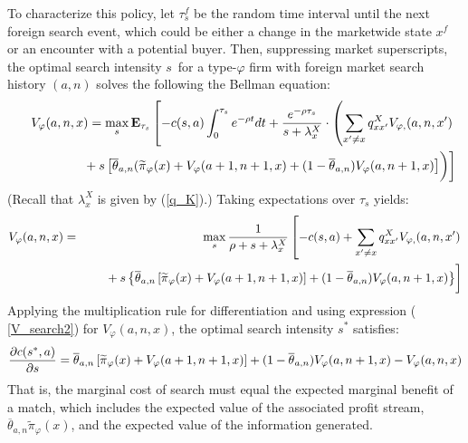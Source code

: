 \documentclass[12pt]{article}
\begin{document}
To characterize this policy, let $\tau _{s}^{f}$ be the random time interval
until the next foreign search event, which could be either a change in the
marketwide state $x^{f}$ or an encounter with a potential buyer. Then,
suppressing market superscripts, the optimal search intensity $s$\ for a
type-$\varphi $ firm with foreign market search history $(a,n)$ solves the
following the Bellman equation:%
\begin{eqnarray*}
&&V_{\varphi }(a,n,x)=\max_{s}\mathbf{E}_{\tau _{s}}\left[
-c(s,a)\int_{0}^{\tau _{s}}e^{-\rho t}dt+\frac{e^{-\rho \tau _{s}}}{%
s+\lambda _{x}^{X}}\cdot \left( \sum_{x^{\prime }\neq x}q_{xx^{\prime
}}^{X}V_{\varphi ,}(a,n,x^{\prime })\right. \right. \\
\; &&\left. \left. 
\begin{array}{c}
\; \\ 
\;%
\end{array}%
+s\left[ \overline{\theta }_{a,n}(\widetilde{\pi }_{\varphi }(x)+V_{\varphi
}(a+1,n+1,x)+(1-\overline{\theta }_{a,n})V_{\varphi }(a,n+1,x)\right]
\right) \right]
\end{eqnarray*}%
(Recall that $\lambda _{x}^{X}$ is given by (\ref{q_K}).) Taking
expectations over $\tau _{s}$ yields:%
\begin{eqnarray}
V_{\varphi }(a,n,x) &=&\max_{s}\frac{1}{\rho +s+\lambda _{x}^{X}}\left[
-c(s,a)+\sum_{x^{\prime }\neq x}q_{xx^{\prime }}^{X}V_{\varphi
,}(a,n,x^{\prime })\right.  \label{V_search2} \\
&&\left. 
\begin{array}{c}
\; \\ 
\;%
\end{array}%
+s\left\{ \overline{\theta }_{a,n}\left[ \widetilde{\pi }_{\varphi
}(x)+V_{\varphi }(a+1,n+1,x)\right] +(1-\overline{\theta }_{a,n})V_{\varphi
}(a,n+1,x)\right\} \right]  \notag
\end{eqnarray}%
Applying the multiplication rule for differentiation and using expression (%
\ref{V_search2}) for $V_{\varphi }(a,n,x)$, the optimal search intensity $%
s^{\ast }$ satisfies:%
\begin{equation}
\frac{\partial c(s^{\ast },a)}{\partial s}=\overline{\theta }_{a,n}\left[ 
\widetilde{\pi }_{\varphi }(x)+V_{\varphi }(a+1,n+1,x)\right] +(1-\overline{%
\theta }_{a,n})V_{\varphi }(a,n+1,x)-V_{\varphi }(a,n,x)
\label{FOC_MS_learning}
\end{equation}%
That is, the marginal cost of search must equal the expected marginal
benefit of a match, which includes the expected value of the associated
profit stream, $\overline{\theta }_{a,n}\widetilde{\pi }_{\varphi }(x)$, and
the expected value of the information generated.
\end{document}
